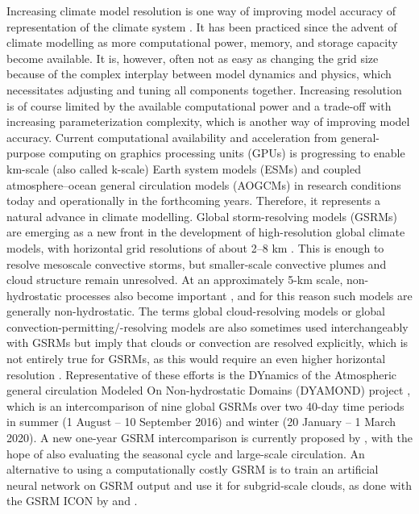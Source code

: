 \documentclass[12pt,a4paper]{article}
\begin{document}
Increasing climate model resolution is one way of improving model accuracy of
representation of the climate system \citep{mauritsen2022}. It has been
practiced since the advent of climate modelling as more computational power,
memory, and storage capacity become available. It is, however, often not as
easy as changing the grid size because of the complex interplay between model
dynamics and physics, which necessitates adjusting and tuning all components
together.  Increasing resolution is of course limited by the available
computational power and a trade-off with increasing parameterization
complexity, which is another way of improving model accuracy.  Current
computational availability and acceleration from general-purpose computing on
graphics processing units (GPUs) is progressing to enable km-scale (also called
k-scale) Earth system models (ESMs) and coupled atmosphere--ocean general
circulation models (AOGCMs) in research conditions today and operationally in
the forthcoming years.  Therefore, it represents a natural advance in climate
modelling.  Global storm-resolving models (GSRMs) are emerging as a new front
in the development of high-resolution global climate models, with horizontal
grid resolutions of about 2--8 km \citep{satoh2019,stevens2019}. This is enough
to resolve mesoscale convective storms, but smaller-scale convective plumes and
cloud structure remain unresolved. At an approximately 5-km scale,
non-hydrostatic processes also become important \citep{weisman1997}, and for
this reason such models are generally non-hydrostatic. The terms global
cloud-resolving models or global convection-permitting/-resolving models are
also sometimes used interchangeably with GSRMs but imply that clouds or
convection are resolved explicitly, which is not entirely true for GSRMs, as
this would require an even higher horizontal resolution \citep{satoh2019}.
Representative of these efforts is the DYnamics of the Atmospheric general
circulation Modeled On Non-hydrostatic Domains (DYAMOND) project
\citep{stevens2019,dyamond}, which is an intercomparison of nine global GSRMs
over two 40-day time periods in summer (1 August -- 10 September 2016) and
winter (20 January -- 1 March 2020). A new one-year GSRM intercomparison is
currently proposed by \cite{takasuka2024}, with the hope of also evaluating the
seasonal cycle and large-scale circulation.  An alternative to using a
computationally costly GSRM is to train an artificial neural network on GSRM
output and use it for subgrid-scale clouds, as done with the GSRM ICON by
\cite{grundner2022} and \cite{grundner2023}.
\end{document}
